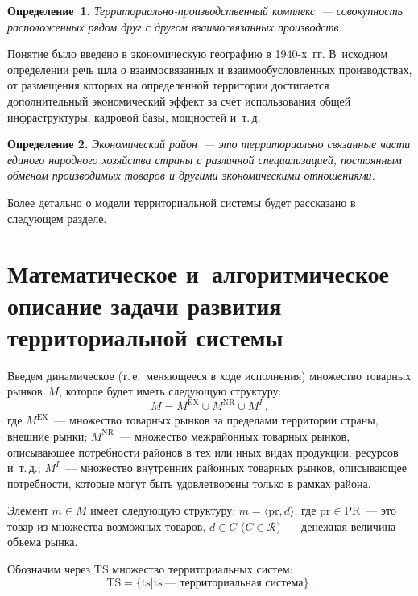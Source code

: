 \begin{multicols}{2}
  \medskip
  
  \noindent
  \textbf{Определение~1.}
   \textit{Тер\-ри\-то\-ри\-аль\-но-про\-из\-вод\-ст\-вен\-ный комплекс~--- 
совокупность расположенных рядом друг с другом взаимосвязанных 
производств.}

  \smallskip
  
  Понятие было введено в экономическую географию в 1940-х~гг. В~исходном 
определении речь шла о взаимосвязанных и взаимообусловленных 
производствах, от размещения которых на определенной территории 
достигается дополнительный экономический эффект за счет использования 
общей инфраструктуры, кадровой базы, мощностей и~т.\,д.
  
  \smallskip
  
  \noindent
  \textbf{Определение 2.} \textit{Экономический район~--- это 
территориально связанные части единого народного хозяйства страны с 
различной специализацией, постоянным обменом производимых товаров и 
другими экономическими отношениями.}

  \smallskip
  
  Более детально о модели территориальной системы будет рассказано 
в следующем разделе.

\section{Математическое и~алгоритмическое описание задачи 
развития территориальной системы}
  
  Введем динамическое (т.\,е.\ меняющееся в ходе исполнения) множество 
товарных рынков~$M$, которое будет иметь следующую структуру: 
  \begin{equation*}
  M=M^{\mathrm{EX}}\cup M^{\mathrm{NR}}\cup M^I\,,
  \end{equation*}
  где $M^{\mathrm{EX}}$~--- множество товарных рынков за пределами территории 
страны, внешние рынки;
  $M^{\mathrm{NR}}$~--- множество межрайонных товарных рынков, описывающее 
потребности районов в тех или иных видах продукции, ресурсов и~т.\,д.;
  $M^I$~--- множество внутренних районных товарных рынков, описывающее 
потребности, которые могут быть удовлетворены только в рамках района. 
  
  Элемент $m\in M$ имеет следующую структуру: $m=\langle \mathrm{pr}, d\rangle$, где 
$\mathrm{pr}\in \mathrm{PR}$~--- это товар из множества возможных товаров, $d\in C$ ($C\in 
\mathcal{R}$)~--- денежная величина объема рынка. 
  
  Обозначим через TS множество территориальных систем: 
  $$
\mathrm{TS}=\{\mathrm{ts}\vert \mathrm{ts}~\mbox{---~территориальная~система}\}\,.
  $$
  

\end{multicols}
